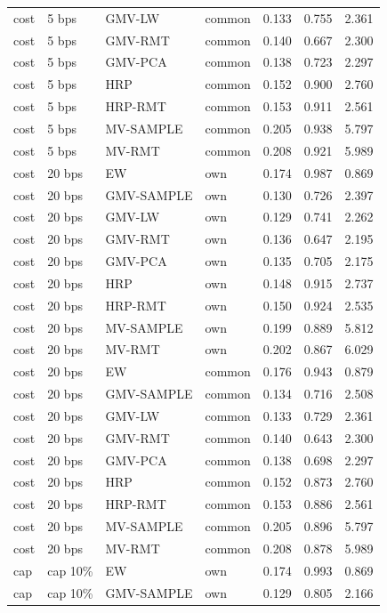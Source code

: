 \begin{table}[t]
{\begin{tabular}{llllrrr}
cost & 5 bps & GMV-LW & common & 0.133 & 0.755 & 2.361 \\
cost & 5 bps & GMV-RMT & common & 0.140 & 0.667 & 2.300 \\
cost & 5 bps & GMV-PCA & common & 0.138 & 0.723 & 2.297 \\
cost & 5 bps & HRP & common & 0.152 & 0.900 & 2.760 \\
cost & 5 bps & HRP-RMT & common & 0.153 & 0.911 & 2.561 \\
cost & 5 bps & MV-SAMPLE & common & 0.205 & 0.938 & 5.797 \\
cost & 5 bps & MV-RMT & common & 0.208 & 0.921 & 5.989 \\
cost & 20 bps & EW & own & 0.174 & 0.987 & 0.869 \\
cost & 20 bps & GMV-SAMPLE & own & 0.130 & 0.726 & 2.397 \\
cost & 20 bps & GMV-LW & own & 0.129 & 0.741 & 2.262 \\
cost & 20 bps & GMV-RMT & own & 0.136 & 0.647 & 2.195 \\
cost & 20 bps & GMV-PCA & own & 0.135 & 0.705 & 2.175 \\
cost & 20 bps & HRP & own & 0.148 & 0.915 & 2.737 \\
cost & 20 bps & HRP-RMT & own & 0.150 & 0.924 & 2.535 \\
cost & 20 bps & MV-SAMPLE & own & 0.199 & 0.889 & 5.812 \\
cost & 20 bps & MV-RMT & own & 0.202 & 0.867 & 6.029 \\
cost & 20 bps & EW & common & 0.176 & 0.943 & 0.879 \\
cost & 20 bps & GMV-SAMPLE & common & 0.134 & 0.716 & 2.508 \\
cost & 20 bps & GMV-LW & common & 0.133 & 0.729 & 2.361 \\
cost & 20 bps & GMV-RMT & common & 0.140 & 0.643 & 2.300 \\
cost & 20 bps & GMV-PCA & common & 0.138 & 0.698 & 2.297 \\
cost & 20 bps & HRP & common & 0.152 & 0.873 & 2.760 \\
cost & 20 bps & HRP-RMT & common & 0.153 & 0.886 & 2.561 \\
cost & 20 bps & MV-SAMPLE & common & 0.205 & 0.896 & 5.797 \\
cost & 20 bps & MV-RMT & common & 0.208 & 0.878 & 5.989 \\
cap & cap 10\% & EW & own & 0.174 & 0.993 & 0.869 \\
cap & cap 10\% & GMV-SAMPLE & own & 0.129 & 0.805 & 2.166 \\

\end{tabular}}
\end{table}
